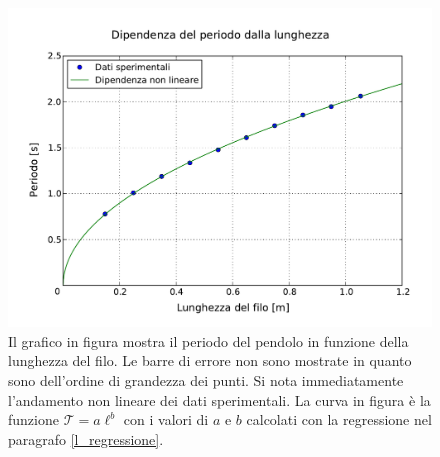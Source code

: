 \begin{figure}
    \centering
    \includegraphics[width=120mm]{immagini/lunghezza_periodo.pdf}
    \caption{Il grafico in figura mostra il periodo del pendolo in funzione della lunghezza del filo.
        Le barre di errore non sono mostrate in quanto sono dell'ordine di grandezza dei punti. Si
        nota immediatamente l'andamento non lineare dei dati sperimentali. La curva in
        figura è la funzione $\mathcal{T} = a\ell^b$ con i valori di $a$ e $b$ calcolati con la regressione
        nel paragrafo \ref{l_regressione}.}
    \label{fig:lunghezza_periodo}
\end{figure}

